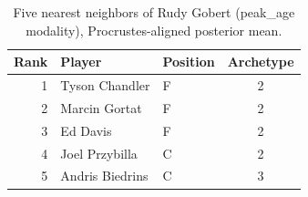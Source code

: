 \begin{table}[htbp]
  \centering\small
  \begin{tabular}{rllc}
    \toprule
    Rank & Player & Position & Archetype \\
    \midrule
    1 & Tyson Chandler & F & 2 \\
    2 & Marcin Gortat & F & 2 \\
    3 & Ed Davis & F & 2 \\
    4 & Joel Przybilla & C & 2 \\
    5 & Andris Biedrins & C & 3 \\
    \bottomrule
  \end{tabular}
  \caption{Five nearest neighbors of Rudy Gobert (peak_age modality), Procrustes-aligned posterior mean.}
  \label{tab:Rudy_Gobert_neighbors_peak_age}
\end{table}

